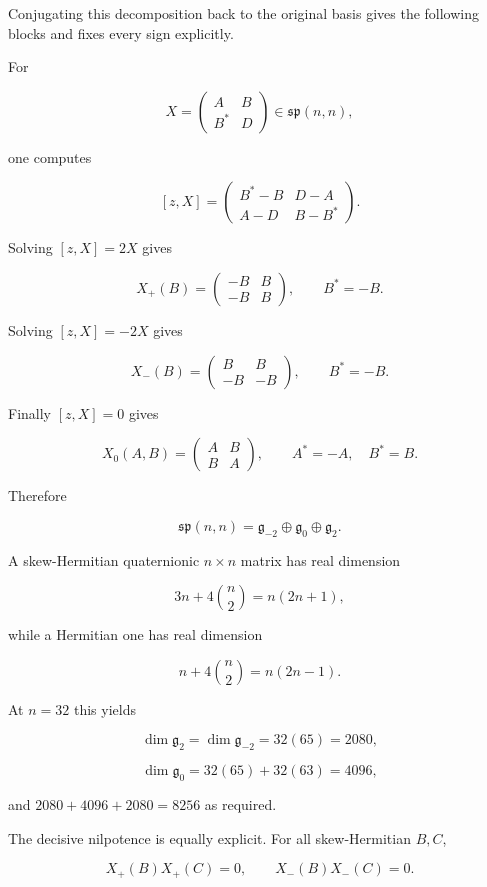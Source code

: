 \documentclass[
  10pt,
  letterpaper,
  oneside]{scrartcl}
\begin{document}
Conjugating this decomposition back to the original basis gives the
following blocks and fixes every sign explicitly.

For

\[
X=
\begin{pmatrix}
A&B\\
B^*&D
\end{pmatrix}
\in\mathfrak{sp}(n,n),
\]

one computes

\[
[z,X]=
\begin{pmatrix}
B^*-B&D-A\\
A-D&B-B^*
\end{pmatrix}.
\]

Solving \([z,X]=2X\) gives

\[
X_+(B)=
\begin{pmatrix}
-B&B\\
-B&B
\end{pmatrix},
\qquad B^*=-B.
\]

Solving \([z,X]=-2X\) gives

\[
X_-(B)=
\begin{pmatrix}
B&B\\
-B&-B
\end{pmatrix},
\qquad B^*=-B.
\]

Finally \([z,X]=0\) gives

\[
X_0(A,B)=
\begin{pmatrix}
A&B\\
B&A
\end{pmatrix},
\qquad A^*=-A,\quad B^*=B.
\]

Therefore

\[
\mathfrak{sp}(n,n)=\mathfrak g_{-2}\oplus\mathfrak g_0\oplus\mathfrak g_{2}.
\]

A skew-Hermitian quaternionic \(n\times n\) matrix has real dimension

\[
3n+4\binom n2=n(2n+1),
\]

while a Hermitian one has real dimension

\[
n+4\binom n2=n(2n-1).
\]

At \(n=32\) this yields

\[
\dim\mathfrak g_{2}=\dim\mathfrak g_{-2}=32(65)=2080,
\]

\[
\dim\mathfrak g_0=32(65)+32(63)=4096,
\]

and \(2080+4096+2080=8256\) as required.

The decisive nilpotence is equally explicit. For all skew-Hermitian
\(B,C\),

\[
X_+(B)X_+(C)=0,
\qquad
X_-(B)X_-(C)=0.
\]
\end{document}

